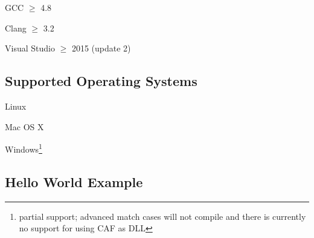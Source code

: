 \begin{itemize*}
  \item GCC $\ge$ 4.8
  \item Clang $\ge$ 3.2
  \item Visual Studio $\ge$ 2015 (update 2)
\end{itemize*}

\subsection{Supported Operating Systems}

\begin{itemize*}
\item Linux
\item Mac OS X
\item Windows\footnote{partial support; advanced match cases will not compile and there is currently no support for using CAF as DLL}
\end{itemize*}

\clearpage
\subsection{Hello World Example}


